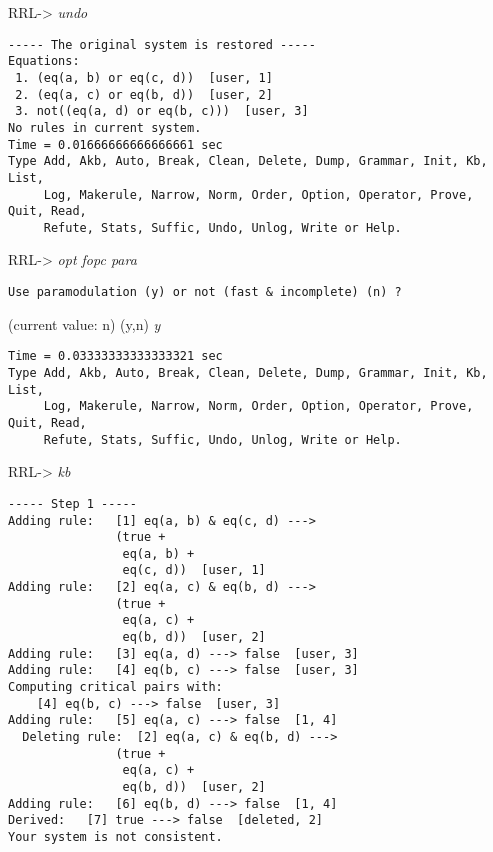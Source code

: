 RRL-> {\em undo}
\begin{verbatim}
----- The original system is restored -----
Equations:
 1. (eq(a, b) or eq(c, d))  [user, 1]
 2. (eq(a, c) or eq(b, d))  [user, 2]
 3. not((eq(a, d) or eq(b, c)))  [user, 3]
No rules in current system.
Time = 0.01666666666666661 sec
Type Add, Akb, Auto, Break, Clean, Delete, Dump, Grammar, Init, Kb, List,
     Log, Makerule, Narrow, Norm, Order, Option, Operator, Prove, Quit, Read,
     Refute, Stats, Suffic, Undo, Unlog, Write or Help.
\end{verbatim}
RRL-> {\em opt fopc para}
\begin{verbatim}
Use paramodulation (y) or not (fast & incomplete) (n) ?
\end{verbatim}
(current value: n) (y,n) {\em y}
\begin{verbatim}
Time = 0.03333333333333321 sec
Type Add, Akb, Auto, Break, Clean, Delete, Dump, Grammar, Init, Kb, List,
     Log, Makerule, Narrow, Norm, Order, Option, Operator, Prove, Quit, Read,
     Refute, Stats, Suffic, Undo, Unlog, Write or Help.
\end{verbatim}
RRL-> {\em kb}
\begin{verbatim}
----- Step 1 -----
Adding rule:   [1] eq(a, b) & eq(c, d) ---> 
               (true + 
                eq(a, b) + 
                eq(c, d))  [user, 1]
Adding rule:   [2] eq(a, c) & eq(b, d) ---> 
               (true + 
                eq(a, c) + 
                eq(b, d))  [user, 2]
Adding rule:   [3] eq(a, d) ---> false  [user, 3]
Adding rule:   [4] eq(b, c) ---> false  [user, 3]
Computing critical pairs with: 
    [4] eq(b, c) ---> false  [user, 3]
Adding rule:   [5] eq(a, c) ---> false  [1, 4]
  Deleting rule:  [2] eq(a, c) & eq(b, d) ---> 
               (true + 
                eq(a, c) + 
                eq(b, d))  [user, 2]
Adding rule:   [6] eq(b, d) ---> false  [1, 4]
Derived:   [7] true ---> false  [deleted, 2]
Your system is not consistent.
\end{verbatim}
\rm
\normalsize

